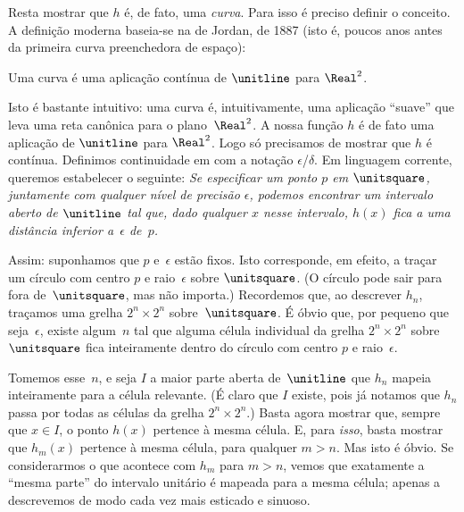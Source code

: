 \documentclass[../../../include/open-logic-section]{subfiles}
\begin{document}
Resta mostrar que $h$ é, de fato, uma \emph{curva}. Para isso
é preciso definir o conceito. A definição moderna baseia-se na de
Jordan, de 1887 (isto é, poucos anos antes da primeira
curva preenchedora de espaço):

\begin{defn}
Uma curva é uma aplicação contínua de $\unitline$ para $\Real^2$.
\end{defn}

Isto é bastante intuitivo: uma curva é, intuitivamente, uma aplicação ``suave''
que leva uma reta canônica para o plano~$\Real^2$. A nossa função
$h$ é de fato uma aplicação de $\unitline$ para $\Real^2$. Logo só precisamos
de mostrar que $h$ é contínua. Definimos continuidade em
 com a notação $\epsilon$/$\delta$. Em linguagem corrente, queremos estabelecer o seguinte: \emph{Se especificar um
ponto $p$ em $\unitsquare$, juntamente com qualquer nível de
precisão $\epsilon$, podemos encontrar um intervalo aberto de $\unitline$ tal
que, dado qualquer $x$ nesse intervalo, $h(x)$ fica a uma distância inferior a~$\epsilon$
de~$p$.}

Assim: suponhamos que $p$ e~$\epsilon$ estão fixos. Isto corresponde, em
efeito, a traçar um círculo com centro $p$ e raio~$\epsilon$ sobre
$\unitsquare$. (O círculo pode sair para fora de~$\unitsquare$,
mas não importa.) Recordemos que, ao descrever
$h_n$, traçamos uma grelha $2^n \times 2^n$ sobre~$\unitsquare$. É
óbvio que, por pequeno que seja~$\epsilon$, existe algum~$n$
tal que alguma célula individual da grelha $2^n \times 2^n$
sobre~$\unitsquare$ fica inteiramente dentro do círculo com centro $p$ e
raio~$\epsilon$.

Tomemos esse~$n$, e seja $I$ a maior parte aberta de~$\unitline$
que $h_n$ mapeia inteiramente para a célula relevante. (É claro
que $I$ existe, pois já notamos que $h_n$ passa por
todas as células da grelha $2^n\times 2^n$.) Basta agora
mostrar que, sempre que $x \in I$, o ponto $h(x)$ pertence à mesma
célula. E, para \emph{isso}, basta mostrar que
$h_m(x)$ pertence à mesma célula, para qualquer $m > n$. Mas isto é
óbvio. Se considerarmos o que acontece com $h_m$ para $m > n$, vemos
que exatamente a ``mesma parte'' do intervalo unitário é mapeada
para a mesma célula; apenas a descrevemos de modo cada vez mais
esticado e sinuoso.
\end{document}
